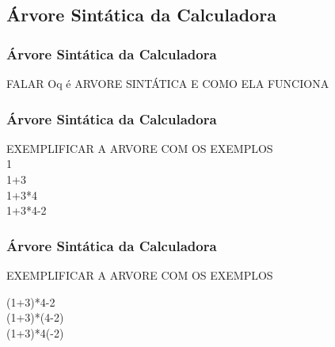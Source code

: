 \documentclass{beamer}
\begin{document}
\subsection{Árvore Sintática da Calculadora }
\begin{frame}
\frametitle{Árvore Sintática da Calculadora }

FALAR Oq é ARVORE SINTÁTICA E COMO ELA FUNCIONA

\end{frame}

\begin{frame}
\frametitle{Árvore Sintática da Calculadora }

EXEMPLIFICAR A ARVORE COM OS EXEMPLOS 
\\ 1 
\\ 1+3
\\ 1+3*4
\\ 1+3*4-2

\end{frame}

\begin{frame}
\frametitle{Árvore Sintática da Calculadora }

EXEMPLIFICAR A ARVORE COM OS EXEMPLOS 

(1+3)*4-2 \\
(1+3)*(4-2) \\
 (1+3)*4(-2)


\end{frame}
\end{document}
